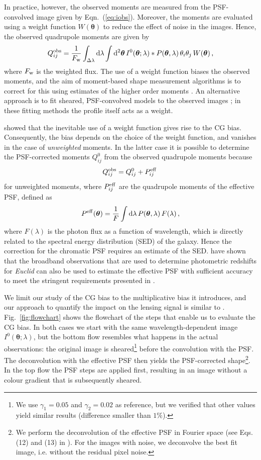 \documentclass[useAMS,usenatbib]{mnras}
\renewcommand{\d}{\mathrm{d}}
\newcommand{\be}{\begin{equation}}
\newcommand{\ee}{\end{equation}}
\begin{document}
In practice, however, the observed moments are measured from the PSF-convolved image given by
Eqn.~(\ref{eq:iobs}). Moreover, the moments are evaluated using a weight function $W({\bm\theta})$  to reduce the effect of noise in the images. Hence, the observed quadrupole moments are given by
\be
Q^{\rm obs}_{ij} = {1 \over F_{\rm w}} \int_{\Delta\lambda} \d\lambda \int \d^2 {\bm\theta} \,
I^0({\bm\theta}; \lambda) *  P({\bm\theta},\lambda)\, \theta_i \theta_j \, W({\bm \theta})\,,
\ee
%
where $F_{\rm w}$ is the weighted flux. The use of a weight function biases the observed moments,
and the aim of moment-based shape measurement algorithms is to correct for this using estimates of the higher order moments \citep[e.g.][]{Kaiser1995,Melchior11}. An alternative approach is to fit sheared, PSF-convolved models to the observed images
\citep[e.g.][]{Bridle02,2007MNRAS.382..315M,2008MNRAS.390..149K,Miller13}; in these fitting methods the profile itself acts as a weight.

 showed that the inevitable use of a weight function gives rise to the CG bias.
Consequently, the bias depends on the choice of the weight function, and vanishes in the case of {\it unweighted} moments. In the latter case it is possible to determine the PSF-corrected moments $Q^0_{ij}$ from the observed quadrupole moments because
%
\be
Q^{\rm obs}_{ij}=Q^0_{ij}+P^{\rm eff}_{ij} \,\label{eq:unweighted}
\ee
%
for unweighted moments, where $P^{\rm eff}_{ij}$ are the quadrupole moments of the effective PSF,  defined as
\be
P^{\rm eff}({\bm \theta}) = \frac{1}{F} \int \d \lambda\, P({\bm \theta},\lambda)\, F(\lambda) \,,
\ee
%
where $F(\lambda)$ is the photon flux as a function of wavelength, which is directly related to the spectral energy distribution (SED) of the galaxy. Hence the correction for the chromatic PSF requires an estimate of the SED.  \cite{Eriksen17} have shown that the broadband observations that are used to determine photometric redshifts for {\it Euclid} can also be used to estimate the effective PSF with sufficient accuracy to meet the stringent requirements presented in \cite{Cropper13}.


We limit our study of the CG bias to the multiplicative bias it
introduces, and our approach to quantify the impact on the lensing
signal is similar to .
Fig.~\ref{fig:flowchart} shows the flowchart of the steps that enable
us to evaluate the CG bias. In both cases we start with the same
wavelength-dependent image $I^0({\bm \theta};\lambda)$, but the bottom
flow resembles what happens in the actual observations: the original
image is sheared\footnote{We use $\gamma_1=0.05$ and $\gamma_2=0.02$
  as reference, but we verified that other values yield similar
  results (difference smaller than $1\%$).} before the convolution
with the PSF. The deconvolution with the effective PSF then yields the
PSF-corrected shape\footnote{We perform the deconvolution of the
  effective PSF in Fourier space (see Eqs.\,(12) and (13) in
  ). For the images with noise, we deconvolve
  the best fit image, i.e. without the residual pixel noise.}.  In the
top flow the PSF steps are applied first, resulting in an image
without a colour gradient that is subsequently sheared.
\end{document}
